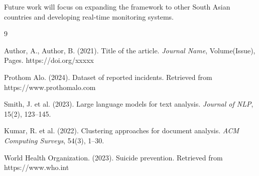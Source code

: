 \documentclass[12pt,a4paper]{article}
\begin{document}
Future work will focus on expanding the framework to other South Asian countries and developing real-time monitoring systems.

\begin{thebibliography}{9}

Author, A., Author, B. (2021). Title of the article. \textit{Journal Name}, Volume(Issue), Pages. https://doi.org/xxxxx

Prothom Alo. (2024). Dataset of reported incidents. Retrieved from https://www.prothomalo.com

Smith, J. et al. (2023). Large language models for text analysis. \textit{Journal of NLP}, 15(2), 123--145.

Kumar, R. et al. (2022). Clustering approaches for document analysis. \textit{ACM Computing Surveys}, 54(3), 1--30.

World Health Organization. (2023). Suicide prevention. Retrieved from https://www.who.int

\end{thebibliography}
\end{document}

